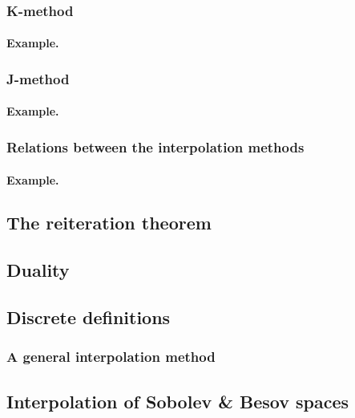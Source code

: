 \documentclass[oneside]{book}
\numberwithin{equation}{section}
\begin{document}
\subsubsection{K-method}

\paragraph{Example.}

\subsubsection{J-method}

\paragraph{Example.}

\subsubsection{Relations between the interpolation methods}

\paragraph{Example.}

\subsection{The reiteration theorem}

\subsection{Duality}

\subsection{Discrete definitions}

\subsubsection{A general interpolation method}

\subsection{Interpolation of Sobolev \& Besov spaces}

\end{document}
